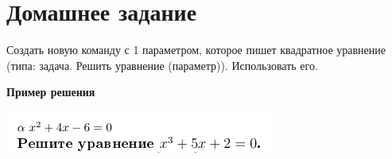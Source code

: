 \chapter{Домашнее задание}

Создать новую команду с 1 параметром, которое пишет квадратное уравнение (типа: задача. Решить уравнение (параметр)). Использовать его.

{\bf Пример решения}

\includegraphics[scale=1,angle=0]{example.png}